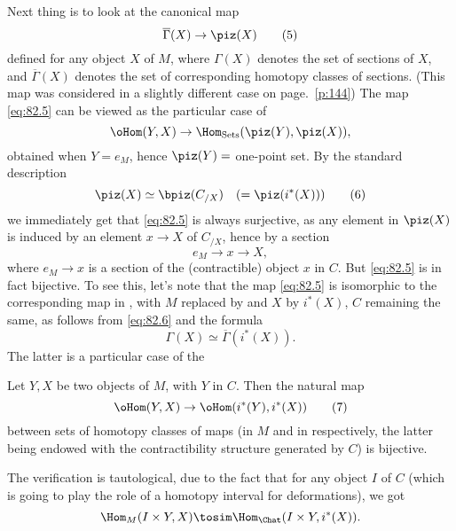 Next thing is to look at the canonical map
\begin{equation}
  \label{eq:82.5}
  \overline\Gamma(X) \to \piz(X)\tag{5}
\end{equation}
defined for any object $X$ of $M$, where $\Gamma(X)$ denotes the set
of sections of $X$, and $\overline\Gamma(X)$ denotes the set of
corresponding homotopy classes of sections. (This map was considered
in a slightly different case on page.\ \ref{p:144}) The map
\eqref{eq:82.5} can be viewed as the particular case of
\[ \oHom(Y,X) \to \Hom_{\mathrm{Sets}}(\piz(Y),\piz(X)),\]
obtained when $Y=e_M$, hence $\piz(Y)=$ one-point set. By the standard
description
\begin{equation}
  \label{eq:82.6}
  \piz(X)\simeq \bpiz(C_{/X}) \quad(=\piz(i^*(X)))\tag{6}
\end{equation}
we immediately get that \eqref{eq:82.5} is always surjective, as any
element in $\piz(X)$ is induced by an element $x\to X$ of $C_{/X}$,
hence by a section
\[ e_M\to x\to X,\]
where $e_M\to x$ is a section of the (contractible) object $x$ in
$C$. But \eqref{eq:82.5} is in fact bijective. To see this, let's note
that the map \eqref{eq:82.5} is isomorphic to the corresponding map in
\Sets, with $M$ replaced by \Chat{} and $X$ by $i^*(X)$, $C$ remaining
the same, as follows from \eqref{eq:82.6} and the formula
\[\Gamma(X) \simeq \overline\Gamma(i^*(X)).\]
The latter is a particular case of the
\begin{lemmanum}\label{lem:82.3}
  Let $Y,X$ be two objects of $M$, with $Y$ in $C$. Then the natural
  map
  \begin{equation}
    \label{eq:82.7}
    \oHom(Y,X) \to \oHom(i^*(Y),i^*(X))\tag{7}
  \end{equation}
  between sets of homotopy classes of maps \textup(in $M$ and in
  \Chat{} respectively, the latter being endowed with the
  contractibility structure generated by $C$\textup) is bijective.
\end{lemmanum}

The verification is tautological, due to the fact that for any object
$I$ of $C$ (which is going to play the role of a homotopy interval for
deformations), we got
\[\Hom_M(I\times Y,X) \tosim \Hom_\Chat(I\times Y, i^*(X)).\]

